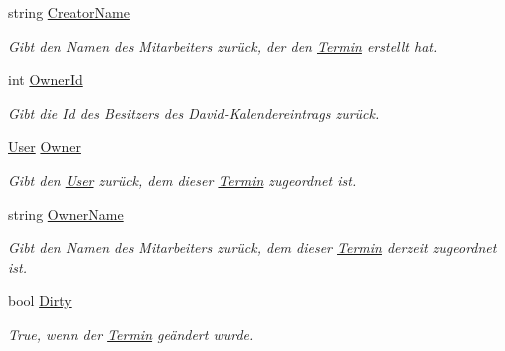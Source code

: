 \begin{DoxyCompactItemize}
string \hyperlink{class_products_1_1_model_1_1_entities_1_1_termin_a47156ac7612f0979f2bd80ccc4739ac6}{Creator\+Name}
\begin{DoxyCompactList}\small\item\em Gibt den Namen des Mitarbeiters zurück, der den \hyperlink{class_products_1_1_model_1_1_entities_1_1_termin}{Termin} erstellt hat. \end{DoxyCompactList}\item 
int \hyperlink{class_products_1_1_model_1_1_entities_1_1_termin_a701661448736a689346c0cf7a3b965b7}{Owner\+Id}
\begin{DoxyCompactList}\small\item\em Gibt die Id des Besitzers des David-\/\+Kalendereintrags zurück. \end{DoxyCompactList}\item 
\hyperlink{class_products_1_1_model_1_1_entities_1_1_user}{User} \hyperlink{class_products_1_1_model_1_1_entities_1_1_termin_a7c583e59c15f0828f152d25d5b127459}{Owner}
\begin{DoxyCompactList}\small\item\em Gibt den \hyperlink{class_products_1_1_model_1_1_entities_1_1_user}{User} zurück, dem dieser \hyperlink{class_products_1_1_model_1_1_entities_1_1_termin}{Termin} zugeordnet ist. \end{DoxyCompactList}\item 
string \hyperlink{class_products_1_1_model_1_1_entities_1_1_termin_a0fbacd8bfbc1986a201c9c0e57529e50}{Owner\+Name}
\begin{DoxyCompactList}\small\item\em Gibt den Namen des Mitarbeiters zurück, dem dieser \hyperlink{class_products_1_1_model_1_1_entities_1_1_termin}{Termin} derzeit zugeordnet ist. \end{DoxyCompactList}\item 
bool \hyperlink{class_products_1_1_model_1_1_entities_1_1_termin_afefcb1493062b38ca52b5cde2c44b067}{Dirty}
\begin{DoxyCompactList}\small\item\em True, wenn der \hyperlink{class_products_1_1_model_1_1_entities_1_1_termin}{Termin} geändert wurde. \end{DoxyCompactList}\item 

\end{DoxyCompactItemize}
